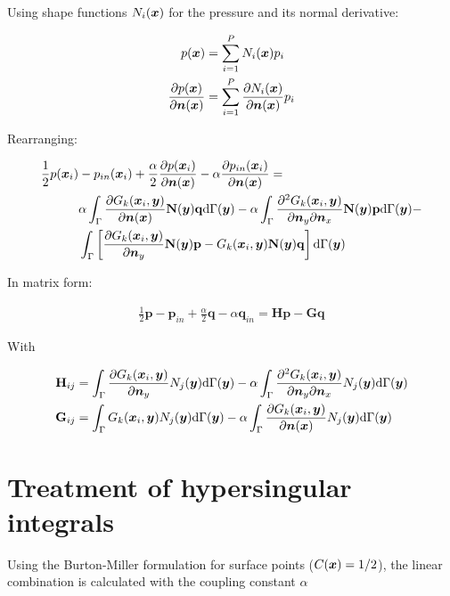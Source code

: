\documentclass[a4paper, 10pt]{article}
\newcommand{\td}{\mathrm{d}}
\newcommand{\sx}{\bm{\mathnormal{x}}}
\newcommand{\sy}{\bm{\mathnormal{y}}}
\newcommand{\sn}{\bm{\mathnormal{n}}}
\newcommand{\bN}{\mathbf{N}}
\newcommand{\bp}{\mathbf{p}}
\newcommand{\bq}{\mathbf{q}}
\newcommand{\bH}{\mathbf{H}}
\newcommand{\bG}{\mathbf{G}}
\begin{document}
Using shape functions $N_i(\sx)$ for the pressure and its normal derivative:

\begin{align}
	p(\sx) & = \sum\limits_{i=1}^P N_i(\sx)p_i \\
	\frac{\partial p(\sx)}{\partial \sn(\sx)} & = \sum\limits_{i=1}^P \frac{\partial N_i(\sx)}{\partial \sn(\sx)}p_i
\end{align}

Rearranging:

\begin{align}
	\frac{1}{2}p(\sx_i) & - p_{in}(\sx_i) + \frac{\alpha}{2}\frac{\partial p(\sx_i)}{\partial \sn(\sx)} - \alpha \frac{\partial p_{in}(\sx_i)}{\partial \sn(\sx)} = \nonumber \\
	& \alpha \int_\Gamma \frac{\partial{G}_k (\sx_i, \sy)}{\partial \sn(\sx)} \bN(\sy)\bq \td \Gamma(\sy)
	- \alpha \int_\Gamma \frac{\partial^2{G}_k (\sx_i, \sy)}{\partial \sn_y \partial \sn_x} \bN(\sy) \bp \td \Gamma(\sy) - \nonumber \\
	& \int_{\Gamma}\left[\frac{\partial{G}_k (\sx_i, \sy)}{\partial \sn_y} \bN(\sy) \bp - G_k(\sx_i,\sy) \bN(\sy) \bq \right] \td \Gamma (\sy) 
\end{align}

In matrix form:

\begin{align}
	\frac{1}{2} \mathbf{p} - \mathbf{p}_{in} + \frac{\alpha}{2} \mathbf{q} - \alpha \mathbf{q}_{in} = \bH \bp - \bG \bq
\end{align}

With

\begin{align}
	\bH_{ij} & = \int_{\Gamma}\frac{\partial{G}_k (\sx_i, \sy)}{\partial \sn_y} N_j(\sy) \td \Gamma(\sy)
	- \alpha \int_\Gamma \frac{\partial^2{G}_k (\sx_i, \sy)}{\partial \sn_y \partial \sn_x} N_j(\sy) \td \Gamma(\sy) \nonumber \\
	\bG_{ij} & = \int_{\Gamma} G_k(\sx_i,\sy) N_j(\sy) \td \Gamma(\sy) - \alpha \int_\Gamma \frac{\partial{G}_k (\sx_i, \sy)}{\partial \sn(\sx)} N_j(\sy) \td \Gamma(\sy)
\end{align}




\section{Treatment of hypersingular integrals}

Using the Burton-Miller formulation for surface points ($C(\sx) = 1/2$), the linear combination is calculated with the coupling constant $\alpha$
\end{document}
